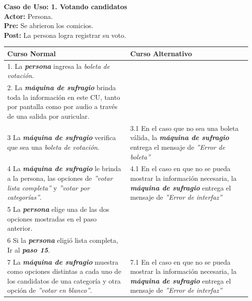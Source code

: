 \documentclass[spanish, 10pt,a4paper]{article}
\numberwithin{equation}{section} %
\begin{document}
\noindent\textbf{Caso de Uso: 1. Votando candidatos}\\
\textbf{Actor: } Persona.\\
\textbf{Pre: } Se abrieron los comicios.\\
\textbf{Post: } La persona logra registrar su voto.\\
\begin{table}[H]
  \centering
\bgroup
\def\arraystretch{1.3}
  \begin{tabular}{p{9cm} | p{7cm}}
    \hline
    Curso Normal & Curso Alternativo \\
    \hline
    \hline    
    1. La \textbf{\textit{persona}} ingresa la \textit{boleta de votación}. 
    & \\
    
    \hline
    2. La \textbf{\textit{máquina de sufragio}} brinda toda la información en este CU, tanto por pantalla como por audio a través de una salida por auricular.
    &
    \\
    
    \hline
    3 La \textbf{\textit{máquina de sufragio}} verifica que sea una \textit{boleta de votación}.
    & 
    3.1 En el caso que no sea una boleta válida, la \textbf{\textit{máquina de sufragio}} entrega el mensaje de \textit{''Error de boleta''}
    \\
    
    \hline
    4 La \textbf{\textit{máquina de sufragio}} le brinda a la persona, las opciones de \textit{''votar lista completa''} y \textit{''votar por categorías''}.
    & 
    4.1 En el caso en que no se pueda mostrar la información necesaria, la \textbf{\textit{máquina de sufragio}} entrega el mensaje de \textit{''Error de interfaz''}
    \\
    
    \hline
    5 La \textbf{\textit{persona}} elige una de las dos opciones mostradas en el paso anterior.
    & \\
    
    \hline
    6 Si la \textbf{\textit{persona}} eligió lista completa, Ir al \textbf{\textit{paso 15}}.
    & \\
    
    \hline
    7 La \textbf{\textit{máquina de sufragio}} muestra como opciones distintas a cada uno de los candidatos de una categoría y otra opción de \textit{''votar en blanco''}.
    & 
    7.1 En el caso en que no se pueda mostrar la información necesaria, la \textbf{\textit{máquina de sufragio}} entrega el mensaje de \textit{''Error de interfaz''}
    \\
    

\end{tabular}
\end{table}
\end{document}

